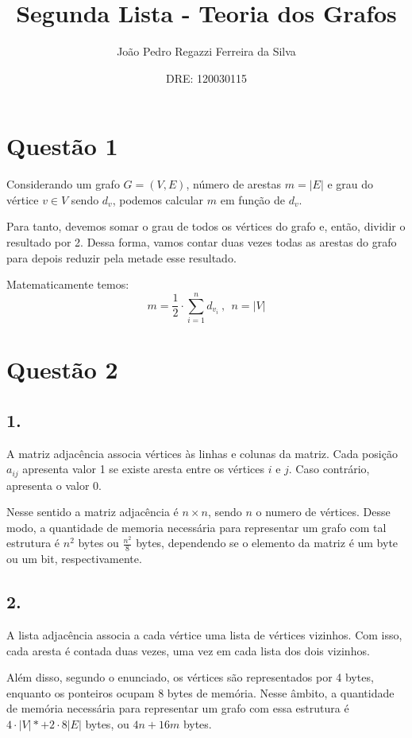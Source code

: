 \documentclass[a4paper,openright, 12pt]{article}
\title{Segunda Lista - Teoria dos Grafos}
\author{João Pedro Regazzi Ferreira da Silva }
\date{DRE: 120030115}
\begin{document}
\maketitle

\section*{Questão 1}
Considerando um grafo $G = (V,E)$, número de arestas $m = |E|$ e grau do vértice $v \in V$ sendo $d_{v}$, podemos calcular $m$ em função de $d_{v}$. \par
Para tanto, devemos somar o grau de todos os vértices do grafo e, então, dividir o resultado por 2. Dessa forma, vamos contar duas vezes todas as arestas do grafo para depois reduzir pela metade esse resultado. \par
Matematicamente temos: 
\[m = \frac{1}{2} \cdot \sum_{i=1}^{n} d_{v_{i}} \:, \ \ n = |V|\]


\section*{Questão 2}

\subsection*{1.}
A matriz adjacência associa vértices às linhas e colunas da matriz. Cada posição $a_{ij}$ apresenta valor 1 se existe aresta entre os vértices $i$ e $j$. Caso contrário, apresenta o valor 0. \par 
Nesse sentido a matriz adjacência é $n \times n$, sendo $n$ o numero de vértices. Desse modo, a quantidade de memoria necessária para representar um grafo com tal estrutura é $n^{2}$ bytes ou $\frac{n^{2}}{8}$ bytes, dependendo se o elemento da matriz é um byte ou um bit, respectivamente.

\subsection*{2.}
A lista adjacência associa a cada vértice uma lista de vértices vizinhos. Com isso, cada aresta é contada duas vezes, uma vez em cada lista dos dois vizinhos. \par
Além disso, segundo o enunciado, os vértices são representados por 4 bytes, enquanto os ponteiros ocupam 8 bytes de memória.
Nesse âmbito, a quantidade de memória necessária para representar um grafo com essa estrutura é $4 \cdot |V|* +  2 \cdot 8  |E|$ bytes, ou $4n + 16m$ bytes.
\end{document}
